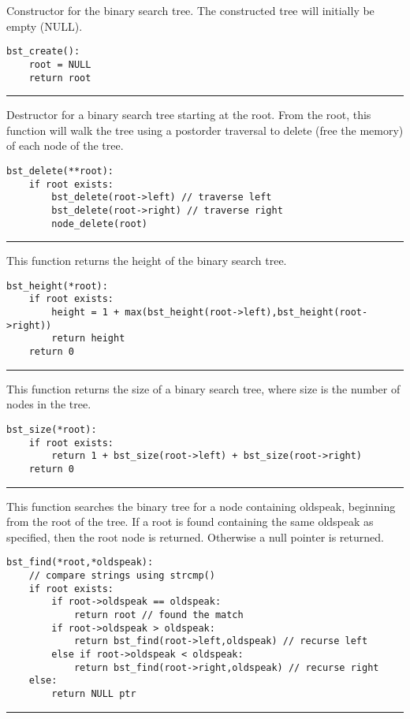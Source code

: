 \documentclass[
	12pt, %
]{fphw}
\begin{document}
Constructor for the binary search tree. The constructed tree will initially be empty (NULL).
\begin{lstlisting}[mathescape=true]
bst_create():
	root = NULL
	return root
\end{lstlisting}
\noindent\rule{6.3in}{0.4pt}

Destructor for a binary search tree starting at the root. From the root, this function will walk the tree using a postorder traversal to delete (free the memory) of each node of the tree.
\begin{lstlisting}[mathescape=true]
bst_delete(**root):
	if root exists:
		bst_delete(root->left) // traverse left
		bst_delete(root->right) // traverse right
		node_delete(root)
\end{lstlisting}
\noindent\rule{6.3in}{0.4pt}

This function returns the height of the binary search tree.
\begin{lstlisting}[mathescape=true]
bst_height(*root):
	if root exists:
		height = 1 + max(bst_height(root->left),bst_height(root->right))
		return height
	return 0
\end{lstlisting}
\noindent\rule{6.3in}{0.4pt}

This function returns the size of a binary search tree, where size is the number of nodes in the tree.
\begin{lstlisting}[mathescape=true]
bst_size(*root):
	if root exists:
		return 1 + bst_size(root->left) + bst_size(root->right)
	return 0
\end{lstlisting}
\noindent\rule{6.3in}{0.4pt}

This function searches the binary tree for a node containing oldspeak, beginning from the root of the tree. If a root is found containing the same oldspeak as specified, then the root node is returned. Otherwise a null pointer is returned.
\begin{lstlisting}[mathescape=true]
bst_find(*root,*oldspeak):
	// compare strings using strcmp()
	if root exists:
		if root->oldspeak == oldspeak:
			return root // found the match
		if root->oldspeak > oldspeak:
			return bst_find(root->left,oldspeak) // recurse left
		else if root->oldspeak < oldspeak:
			return bst_find(root->right,oldspeak) // recurse right
	else:
		return NULL ptr
\end{lstlisting}
\noindent\rule{6.3in}{0.4pt}
\end{document}
